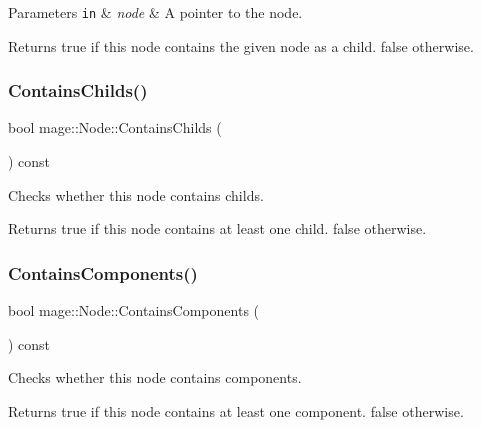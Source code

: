 \begin{DoxyParams}[1]{Parameters}
\mbox{\tt in}  & {\em node} & A pointer to the node. \\
\hline
\end{DoxyParams}
\begin{DoxyReturn}{Returns}
{\ttfamily true} if this node contains the given node as a child. {\ttfamily false} otherwise. 
\end{DoxyReturn}
\hypertarget{classmage_1_1_node_afd885043a9de1b0c09d1eb0ef7bf6006}{}\label{classmage_1_1_node_afd885043a9de1b0c09d1eb0ef7bf6006} 
\subsubsection{\texorpdfstring{Contains\+Childs()}{ContainsChilds()}}
{\footnotesize\ttfamily bool mage\+::\+Node\+::\+Contains\+Childs (\begin{DoxyParamCaption}{ }\end{DoxyParamCaption}) const}

Checks whether this node contains childs.

\begin{DoxyReturn}{Returns}
{\ttfamily true} if this node contains at least one child. {\ttfamily false} otherwise. 
\end{DoxyReturn}
\hypertarget{classmage_1_1_node_aafb492896751b5b60ba5ddaeecbdd719}{}\label{classmage_1_1_node_aafb492896751b5b60ba5ddaeecbdd719} 
\subsubsection{\texorpdfstring{Contains\+Components()}{ContainsComponents()}}
{\footnotesize\ttfamily bool mage\+::\+Node\+::\+Contains\+Components (\begin{DoxyParamCaption}{ }\end{DoxyParamCaption}) const\hspace{0.3cm}{\ttfamily [noexcept]}}

Checks whether this node contains components.

\begin{DoxyReturn}{Returns}
{\ttfamily true} if this node contains at least one component. {\ttfamily false} otherwise. 
\end{DoxyReturn}
\hypertarget{classmage_1_1_node_a5ec6963ed4eb9d0463e220a53555d27a}{}\label{classmage_1_1_node_a5ec6963ed4eb9d0463e220a53555d27a} 
